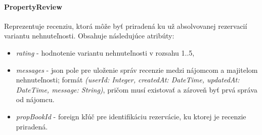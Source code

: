 \paragraph{PropertyReview} \text{ } \newline
Reprezentuje recenziu, ktorá môže byť priradená ku už absolvovanej rezervacií variantu nehnuteľnosti.
Obsahuje následujúce atribúty:
\begin{itemize}[itemsep=2pt]
    \item \textit{rating} - hodnotenie variantu nehnuteľnosti v rozsahu 1..5,
    \item \textit{messages} - json pole pre uloženie správ recenzie medzi nájomcom a majitelom nehnuteľnosti; formát \textit{(userId: Integer, createdAt: DateTime, updatedAt: DateTime, message: String)}, pričom musí existovať a zároveň byť prvá správa od nájomcu.
    \item \textit{propBookId} - foreign kľúč pre identifikáciu rezervácie, ku ktorej je recenzie priradená.
\end{itemize}